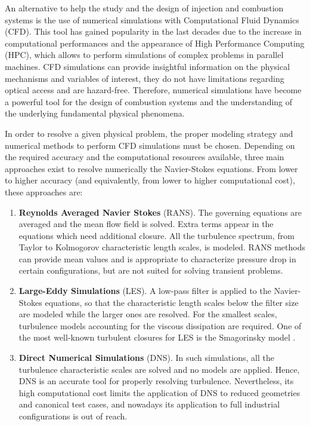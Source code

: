 An alternative to help the study and the design of injection and combustion systems is the use of numerical simulations with Computational Fluid Dynamics (CFD). This tool has gained popularity in the last decades due to the increase in computational performances and the appearance of High Performance Computing (HPC), which allows to perform simulations of complex problems in parallel machines. CFD simulations can provide insightful information on the physical mechanisms and variables of interest, they do not have limitations regarding optical access and are hazard-free. Therefore, numerical simulations have become a powerful tool for the design of combustion systems and the understanding of the underlying fundamental physical phenomena.

In order to resolve a given physical problem, the proper modeling strategy and numerical methods to perform CFD simulations must be chosen. Depending on the required accuracy and the computational resources available, three main approaches exist to resolve numerically the Navier-Stokes equations. From lower to higher accuracy (and equivalently, from lower to higher computational cost), these approaches are:

\begin{enumerate}

	\item \textbf{Reynolds Averaged Navier Stokes} (RANS). The governing equations are averaged and the mean flow field is solved. Extra terms appear in the equations which need additional closure. All the turbulence spectrum, from Taylor to Kolmogorov characteristic length scales, is modeled. RANS methods can provide mean values and is appropriate to characterize pressure drop in certain configurations, but are not suited for solving transient problems.
	
	\item \textbf{Large-Eddy Simulations} (LES). A low-pass filter is applied to the Navier-Stokes equations, so that the characteristic length scales below the filter size are modeled while the larger ones are resolved. For the smallest scales, turbulence models accounting for the viscous dissipation are required. One of the most well-known turbulent closures for LES is the Smagorinsky model .
	
	\item \textbf{Direct Numerical Simulations} (DNS). In such simulations, all the turbulence characteristic scales are solved and no models are applied. Hence, DNS is an accurate tool for properly resolving turbulence. Nevertheless, its high computational cost limits the application of DNS to reduced geometries and canonical test cases, and nowadays its application to full industrial configurations is out of reach.

\end{enumerate}

